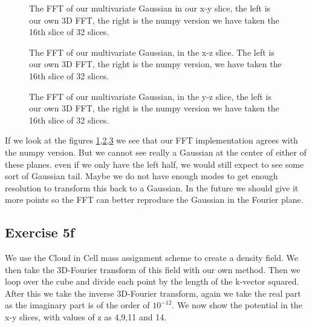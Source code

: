 \begin{figure}
    \centering
    \qquad
    \caption{The FFT of our multivariate Gaussian in our x-y slice, the left is our own 3D FFT, the right is the numpy version we have taken the 16th slice of 32 slices.}
    \label{3dfftxy}
  \end{figure}
  
  \begin{figure}
    \centering
    \qquad
    \caption{The FFT of our multivariate Gaussian, in the x-z slice. The left is our own 3D FFT, the right is the numpy version, we have taken the 16th slice of 32 slices.}
    \label{3dfftxz}
  \end{figure}
  
  \begin{figure}
    \centering
    \qquad
    \caption{The FFT of our multivariate Gaussian, in the y-z slice, the left is our own 3D FFT, the right is the numpy version we have taken the 16th slice of 32 slices.}
    \label{3dfftyz}
  \end{figure}
 If we look at the figures \ref{3dfftxy},\ref{3dfftxz},\ref{3dfftyz} we see that our FFT implementation agrees with the numpy version. But we cannot see really a Gaussian at the center of either of these planes. even if we only have the left half, we would still expect to see some sort of Gaussian tail. Maybe we do not have enough modes to get enough resolution to transform this back to a Gaussian. In the future we should give it more points so the FFT can better reproduce the Gaussian in the Fourier plane.

\subsection{Exercise 5f}
We use the Cloud in Cell mass assignment scheme to create a density field. We then take the 3D-Fourier transform of this field with our own method. Then we loop over the cube and divide each point by the length of the k-vector squared. After this we take the inverse 3D-Fourier transform, again we take the real part as the imaginary part is of the order of $10^{-12}$. We now show the potential in the x-y slices, with values of z as 4,9,11 and 14.

